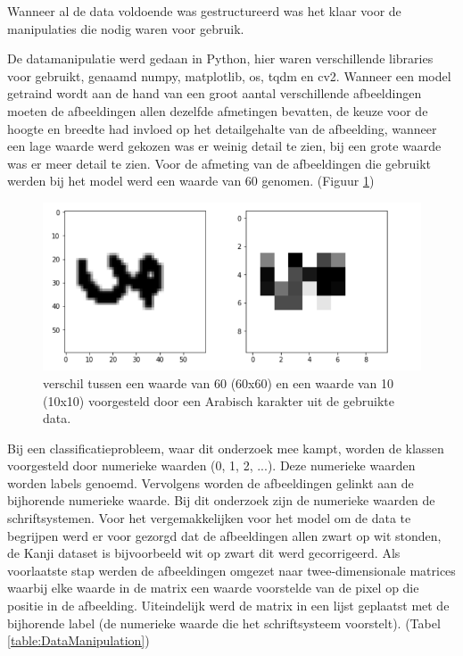 Wanneer al de data voldoende was gestructureerd was het klaar voor de manipulaties die nodig waren voor gebruik.

De datamanipulatie werd gedaan in Python, hier waren verschillende libraries voor gebruikt, genaamd numpy, matplotlib, os, tqdm en cv2.
Wanneer een model getraind wordt aan de hand van een groot aantal verschillende afbeeldingen moeten de afbeeldingen allen dezelfde afmetingen bevatten, de keuze voor de hoogte en breedte had invloed op het detailgehalte van de afbeelding, wanneer een lage waarde werd gekozen was er weinig detail te zien, bij een grote waarde was er meer detail te zien.
Voor de afmeting van de afbeeldingen die gebruikt werden bij het model werd een waarde van 60 genomen. (Figuur \ref{tab:afmetingen})


\begin{figure}
    
    
    \includegraphics[width=\linewidth]{img/Afmetingen.png}

    \caption{verschil tussen een waarde van 60 (60x60) en een waarde van 10 (10x10) voorgesteld door een Arabisch karakter uit de gebruikte data.}
    \label{tab:afmetingen}
    
\end{figure}

Bij een classificatieprobleem, waar dit onderzoek mee kampt, worden de klassen voorgesteld door numerieke waarden (0, 1, 2, ...). Deze numerieke waarden worden labels genoemd.
Vervolgens worden de afbeeldingen gelinkt aan de bijhorende numerieke waarde.
Bij dit onderzoek zijn de numerieke waarden de schriftsystemen.
Voor het vergemakkelijken voor het model om de data te begrijpen werd er voor gezorgd dat de afbeeldingen allen zwart op wit stonden, de Kanji dataset is bijvoorbeeld wit op zwart dit werd gecorrigeerd.
Als voorlaatste stap werden de afbeeldingen omgezet naar twee-dimensionale matrices waarbij elke waarde in de matrix een waarde voorstelde van de pixel op die positie in de afbeelding.
Uiteindelijk werd de matrix in een lijst geplaatst met de bijhorende label (de numerieke waarde die het schriftsysteem voorstelt). (Tabel \ref{table:DataManipulation})


